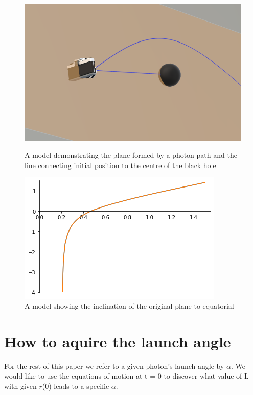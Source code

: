 \documentclass[oneside,openright,frontopenright, singlespacing]{dmathesis}
\begin{document}
\begin{figure}[!ht]
	\centering
	\begin{minipage}{0.5\textwidth}
		\centering
		\includegraphics[width=0.8\linewidth]{img/plane}
		\caption{A model demonstrating the plane formed by a photon path and the line connecting initial position to the centre of the black hole}
	\end{minipage}%
	\hfill
	\begin{minipage}{0.5\textwidth}
		\centering
		\includegraphics[width=0.8\linewidth]{img/alpha-prime_f(alpha)}
		\caption{A model showing the inclination of the original plane to equatorial}
	\end{minipage}
\end{figure}

\section{How to aquire the launch angle}

	For the rest of this paper we refer to a given photon's launch angle by $\alpha$. We would like to use the equations of motion at t = 0 to discover what value of L with given $\dot{r}$(0) leads to a specific $\alpha$.
\end{document}
